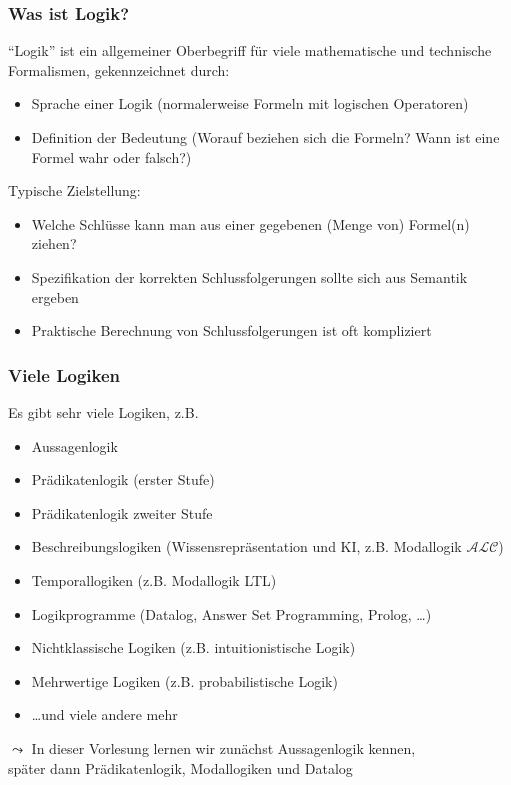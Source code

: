 \documentclass[aspectratio=1610,onlymath]{beamer}
\begin{document}
\begin{frame}\frametitle{Was ist Logik?}
\pause

"`Logik"' ist ein allgemeiner Oberbegriff für viele mathematische und technische Formalismen,
gekennzeichnet durch:
\begin{itemize}
\item {} Sprache einer Logik (normalerweise Formeln mit logischen Operatoren)
\item {} Definition der Bedeutung (Worauf beziehen sich die Formeln? Wann ist eine Formel wahr oder falsch?)
\end{itemize}\bigskip\pause

Typische Zielstellung: 
\begin{itemize}
\item Welche Schlüsse kann man aus einer gegebenen (Menge von) Formel(n) ziehen?
\item Spezifikation der korrekten Schlussfolgerungen sollte sich aus Semantik ergeben
\item Praktische Berechnung von Schlussfolgerungen ist oft kompliziert
\end{itemize}

\end{frame}

\begin{frame}\frametitle{Viele Logiken}

Es gibt sehr viele Logiken, z.B.
\begin{itemize}
\item Aussagenlogik
\item Prädikatenlogik (erster Stufe)
\item Prädikatenlogik zweiter Stufe
\item Beschreibungslogiken (Wissensrepräsentation und KI, z.B. Modallogik $\mathcal{ALC}$)
\item Temporallogiken (z.B. Modallogik LTL)
\item Logikprogramme (Datalog, Answer Set Programming, Prolog, \ldots)
\item Nichtklassische Logiken (z.B. intuitionistische Logik)
\item Mehrwertige Logiken (z.B. probabilistische Logik)
\item \ldots und viele andere mehr
\end{itemize}

$\leadsto$ In dieser Vorlesung lernen wir zunächst \alert{Aussagenlogik} kennen,\\\phantom{$\leadsto${}} später dann \alert{Prädikatenlogik}, \alert{Modallogiken} und \alert{Datalog}

\end{frame}
\end{document}
